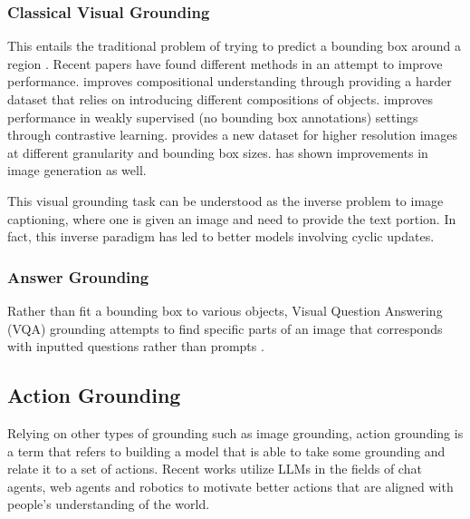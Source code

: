 \documentclass[11pt]{article}
\begin{document}
\subsubsection{Classical Visual Grounding}
This entails the traditional problem of trying to predict a bounding box around a region \cite{li-etal-2024-groundinggpt,huang2021deconfoundedvisualgrounding,peng2023kosmos2groundingmultimodallarge}. Recent papers have found different methods in an attempt to improve performance.  \citet{Zeng_2024_CVPR_Comp_Challenge} improves compositional understanding through providing a harder dataset that relies on introducing different compositions of objects. \citet{neurips_zhang_contrastive_learning} improves performance in weakly supervised (no bounding box annotations) settings through contrastive learning. \citet{gigapixel} provides a new dataset for higher resolution images at different granularity and bounding box sizes. \citet{lee2024regroundimprovingtextualspatial} has shown improvements in image generation as well.

This visual grounding task can be understood as the inverse problem to image captioning, where one is given an image and need to provide the text portion. In fact, this inverse paradigm has led to better models \cite{wang2023cycleconsistencylearningcaptioninggrounding} involving cyclic updates.

\subsubsection{Answer Grounding}
Rather than fit a bounding box to various objects, Visual Question Answering (VQA) grounding attempts to find specific parts of an image that corresponds with inputted questions rather than prompts \cite{chen2022groundinganswersvisualquestions, Chen_2023_ICCV_vqa}.

\subsection{Action Grounding}
Relying on other types of grounding such as image grounding, action grounding is a term that refers to building a model that is able to take some grounding and relate it to a set of actions. Recent works utilize LLMs in the fields of chat agents, web agents and robotics \cite{zhang2023llavagroundinggroundedvisualchat, cheng-etal-2024-seeclick,zheng2024gpt4visiongeneralistwebagent,Tellex_Kollar_Dickerson_Walter_Banerjee_Teller_Roy_2011_robotic_navigation,wang2023programmaticallygroundedcompositionallygeneralizable} to motivate better actions that are aligned with people's understanding of the world.
\end{document}
